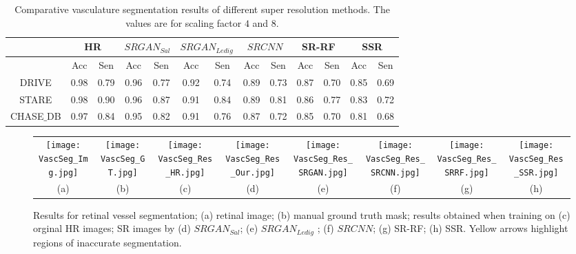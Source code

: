 \documentclass{llncs}
\begin{document}
\begin{table}[t]
\begin{tabular}{|c|c|c|c|c|c|c|c|c|c|c|c|c|}
\hline{} & \multicolumn{2}{|c|}{HR} & \multicolumn{2}{|c|}{$SRGAN_{Sal}$} & \multicolumn{2}{|c|}{$SRGAN_{Ledig}$} & \multicolumn{2}{|c|}{$SRCNN$} & \multicolumn{2}{|c|}{SR-RF} & \multicolumn{2}{|c|}{SSR} \\  \hline{} & {Acc} & {Sen}  & {Acc} & {Sen} &{Acc} & {Sen} & {Acc} & {Sen}  & {Acc} & {Sen} &{Acc} & {Sen} \\ \hline{DRIVE} & 0.98  & 0.79  & {0.96} & {0.77} & 0.92  & 0.74 & 0.89 & 0.73 & 0.87  & 0.70 & 0.85 & 0.69 \\  \hline{STARE} & 0.98  & 0.90  & 0.96 & 0.87 & 0.91  & 0.84  & 0.89 &  0.81 & 0.86  & 0.77  & 0.83 & 0.72 \\  \hline{CHASE$\_$DB} & 0.97 &  0.84  & 0.95 & 0.82  & 0.91  & 0.76  &  0.87 &  0.72& 0.85 &  0.70  & 0.81 & 0.68  \\  \hline
\end{tabular}
\caption{Comparative vasculature segmentation results of different super resolution methods. The values are for scaling factor $4$ and $8$.}
\label{tab:SrRes_vasc}
\end{table}\begin{figure*}[t]
\begin{tabular}{cccccccc}
\texttt{[image: VascSeg\_Img.jpg]} &
\texttt{[image: VascSeg\_GT.jpg]} &
\texttt{[image: VascSeg\_Res\_HR.jpg]} &
\texttt{[image: VascSeg\_Res\_Our.jpg]} &
\texttt{[image: VascSeg\_Res\_SRGAN.jpg]} &
\texttt{[image: VascSeg\_Res\_SRCNN.jpg]} &
\texttt{[image: VascSeg\_Res\_SRRF.jpg]} &
\texttt{[image: VascSeg\_Res\_SSR.jpg]} \\
%
(a) & (b) & (c) & (d) & (e) & (f) & (g) & (h) \\ 
\end{tabular}
\caption{Results for retinal vessel segmentation; (a) retinal image; (b) manual ground truth mask; results obtained when training on (c) orginal HR images; SR images by (d) $SRGAN_{Sal}$; (e) $SRGAN_{Ledig}$ ; (f) $SRCNN$; (g) SR-RF; (h) SSR. Yellow arrows highlight regions of inaccurate segmentation.}
\label{fig:res1}
\end{figure*}
\end{document}
